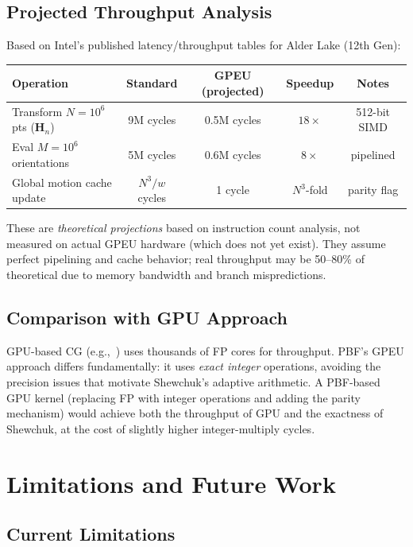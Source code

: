 \documentclass[11pt,letterpaper]{article}
\newcommand{\Hn}{\mathbf{H}_n}
\newcommand{\wt}{w}       %
\begin{document}
\subsection{Projected Throughput Analysis}

Based on Intel's published latency/throughput tables for Alder Lake (12th Gen):

\begin{center}
\begin{tabular}{lcccc}
\toprule
Operation & Standard & GPEU (projected) & Speedup & Notes \\
\midrule
Transform $N=10^6$ pts ($\Hn$) & 9M cycles & 0.5M cycles & $18\times$ & 512-bit SIMD \\
Eval $M=10^6$ orientations & 5M cycles & 0.6M cycles & $8\times$ & pipelined \\
Global motion cache update & $N^3/\wt$ cycles & 1 cycle & $N^3$-fold & parity flag \\
\bottomrule
\end{tabular}
\end{center}

These are \emph{theoretical projections} based on instruction count analysis, not
measured on actual GPEU hardware (which does not yet exist).  They assume perfect
pipelining and cache behavior; real throughput may be 50--80\% of theoretical due to
memory bandwidth and branch mispredictions.

\subsection{Comparison with GPU Approach}

GPU-based CG (e.g.,~\cite{Karras12}) uses thousands of FP cores for throughput.  PBF's
GPEU approach differs fundamentally: it uses \emph{exact integer} operations, avoiding
the precision issues that motivate Shewchuk's adaptive arithmetic.  A PBF-based GPU
kernel (replacing FP with integer operations and adding the parity mechanism) would
achieve both the throughput of GPU and the exactness of Shewchuk, at the cost of slightly
higher integer-multiply cycles.

\section{Limitations and Future Work}\label{sec:limitations}

\subsection{Current Limitations}
\end{document}
